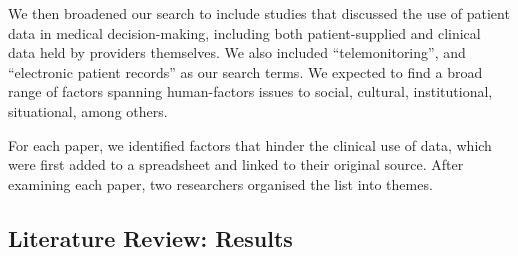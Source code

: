 \documentclass{sigchi}
\begin{document}
We then broadened our search to include studies that discussed the use of patient data in medical decision-making, including both patient-supplied and clinical data held by providers themselves.  We also included ``telemonitoring'', and ``electronic patient records'' as our search terms.  We  expected to find a broad range of factors spanning human-factors issues to social, cultural, institutional, situational, among others.

For each paper, we identified factors that hinder the clinical use of data, which were first added to a spreadsheet and linked to their original source.  After examining each paper, two researchers organised the list into themes.  %

\subsection{Literature Review: Results}
\end{document}
